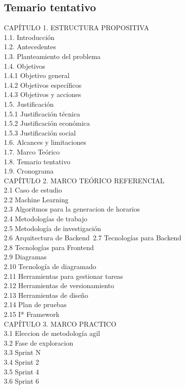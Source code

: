\subsection{Temario tentativo}

CAPÍTULO 1. ESTRUCTURA PROPOSITIVA \\
1.1. Introducción \\
1.2. Antecedentes \\
1.3. Planteamiento del problema \\
1.4. Objetivos \\
1.4.1 Objetivo general\\
1.4.2 Objetivos específicos \\
1.4.3 Objetivos y acciones \\
1.5. Justificación \\
1.5.1 Justificación técnica \\
1.5.2 Justificación económica \\
1.5.3 Justificación social \\
1.6. Alcances y limitaciones \\
1.7. Marco Teórico \\
1.8. Temario tentativo \\
1.9. Cronograma \\

CAPÍTULO 2. MARCO TEÓRICO REFERENCIAL \\
2.1 Caso de estudio\\
2.2 Machine Learning\\
2.3 Algoritmos para la generacion de horarios \\
2.4 Metodologías de trabajo\\
2.5 Metodología de investigación\\
2.6 Arquitectura de Backend\
2.7 Tecnologías para Backend\\
2.8 Tecnologías para Frontend\\
2.9 Diagramas\\
2.10 Tecnología de diagramado\\
2.11 Herramientas para gestionar tareas\\
2.12 Herramientas de versionamiento\\
2.13 Herramientas de diseño\\
2.14 Plan de pruebas\\
2.15 I* Framework\\

CAPÍTULO 3. MARCO PRACTICO \\

3.1 Eleccion de metodología agil \\
3.2 Fase de exploracion \\
3.3 Sprint N \\
3.4 Sprint 2 \\
3.5 Sprint 4 \\
3.6 Sprint 6 \\

